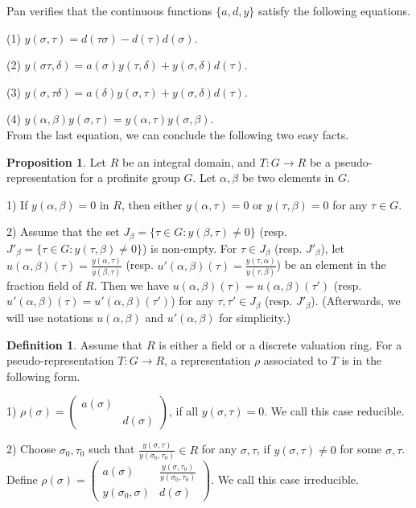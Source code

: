 \documentclass[12pt]{amsart}
\theoremstyle{plain}
\theoremstyle{definition}
\newtheorem{defn}[thm]{Definition}
\newtheorem{prop}[thm]{Proposition}
\theoremstyle{remark}
\begin{document}
Pan \cite[2.1.4]{pan2022fontaine} verifies that the continuous functions $\{a,d,y\}$ satisfy the following equations.

(1) $y(\sigma, \tau)=d(\tau\sigma)-d(\tau)d(\sigma)$.

(2) $y(\sigma\tau, \delta)=a(\sigma)y(\tau, \delta)+y(\sigma, \delta)d(\tau)$.

(3) $y(\sigma, \tau\delta)=a(\delta)y(\sigma, \tau)+y(\sigma, \delta)d(\tau)$.

(4) $y(\alpha, \beta)y(\sigma, \tau)=y(\alpha, \tau)y(\sigma, \beta)$.\\

From the last equation, we can conclude the following two easy facts.

\begin{prop}\label{u}
	Let $R$ be an integral domain, and $T: G \to R$ be a pseudo-representation for a profinite group $G$. Let $\alpha, \beta $ be two elements in $ G$.
	
	1) If $y(\alpha, \beta) =0$ in $R$, then either $y(\alpha, \tau)=0$ or $y(\tau, \beta)=0$ for any $\tau \in G$.
	
	2) Assume that the set $J_{\beta} =\{\tau \in G : y(\beta, \tau)\ne 0\}$ (resp. $J'_{\beta} =\{\tau \in G : y(\tau, \beta) \ne 0\}$) is non-empty. For $\tau \in J_{\beta}$ (resp. $J'_{\beta}$), let $u(\alpha, \beta)(\tau)= \frac{y(\alpha, \tau)}{y(\beta, \tau)}$ (resp. $u'(\alpha, \beta)(\tau)=\frac{y(\tau, \alpha)}{y(\tau, \beta)}$) be an element in the fraction field of $R$. Then we have $u(\alpha, \beta)(\tau)=u(\alpha, \beta)(\tau')$ (resp. $u'(\alpha, \beta)(\tau)=u'(\alpha, \beta)(\tau')$)  for any $\tau, \tau' \in J_\beta$ (resp. $J'_{\beta}$). (Afterwards, we will use notations $u(\alpha, \beta)$ and $u'(\alpha, \beta)$ for simplicity.)
\end{prop}

\begin{defn}\label{construction}\cite[2.1.5]{pan2022fontaine}
	Assume that $R$  is either a field or a discrete valuation ring. For a pseudo-representation $T: G\to R$, a representation $\rho$ associated to $T$ is in the following form.
	
	1) $ \rho(\sigma)=
	\begin{pmatrix}
		a(\sigma) & ~\\
		~& d(\sigma)
	\end{pmatrix}$, if all $y(\sigma, \tau)=0$. We call this case reducible.
	
	2) Choose $\sigma_0, \tau_0$ such that $\frac{y(\sigma, \tau)}{y(\sigma_0, \tau_0)} \in R$ for any $ \sigma, \tau$, if $y(\sigma, \tau) \ne 0 $ for some $ \sigma, \tau$. Define $ \rho(\sigma)=
	\begin{pmatrix}
		a(\sigma) & \frac{y(\sigma, \tau_0)}{y(\sigma_0, \tau_0)}\\
		y(\sigma_0, \sigma)& d(\sigma)
	\end{pmatrix}$.  We call this case irreducible.
\end{defn}
\end{document}
